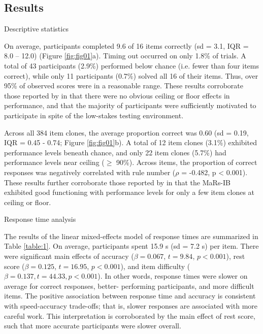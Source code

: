 \documentclass[a4paper,man,natbib]{apa6}
\makeatletter
\renewcommand{\subsubsection}{\@startsection{subsubsection}{3}
  {\z@}%
  {\b@level@two@skip}{\e@level@two@skip}%
  {\normalfont\normalsize\bfseries}}
\makeatother
\begin{document}
\subsection{Results}

\subsubsection{Descriptive statistics}

On average, participants completed 9.6 of 16 items correctly (sd = 3.1, IQR = 8.0 -- 12.0) (Figure \ref{fig:fig01}a). Timing out occurred on only 1.8\% of trials. A total of 43 participants (2.9\%) performed below chance (i.e. fewer than four items correct), while only 11 participants (0.7\%) solved all 16 of their items. Thus, over 95\% of observed scores were in a reasonable range. These results corroborate those reported by \cite{chierchia2019matrix} in that there were no obvious ceiling or floor effects in performance, and that the majority of participants were sufficiently motivated to participate in spite of the low-stakes testing environment.  

Across all 384 item clones, the average proportion correct was 0.60 (sd = 0.19, IQR = 0.45 - 0.74; Figure \ref{fig:fig01}b). A total of 12 item clones (3.1\%) exhibited performance levels beneath chance, and only 22 item clones (5.7\%) had performance levels near ceiling ($\geq$ 90\%). Across items, the proportion of correct responses was negatively correlated with rule number ($\rho$ = -0.482, p < 0.001). These results further corroborate those reported by \cite{chierchia2019matrix} in that the MaRs-IB exhibited good functioning with performance levels for only a few item clones at ceiling or floor. 

\subsubsection{Response time analysis}

The results of the linear mixed-effects model of response times are summarized in Table \ref{table:1}. On average, participants spent 15.9 s (sd = 7.2 s) per item. There were significant main effects of accuracy ($\beta = 0.067$, $t = 9.84$, $p < 0.001$), rest score ($\beta = 0.125$, $t = 16.95$, $p < 0.001$), and item difficulty ($\beta = 0.137, t = 44.33, p < 0.001$). In other words, response times were slower on average for correct responses, better- performing participants, and more difficult items. The positive association between response time and accuracy is consistent with speed-accuracy trade-offs; that is, slower responses are associated with more careful work. This interpretation is corroborated by the main effect of rest score, such that more accurate participants were slower overall. 
\end{document}
